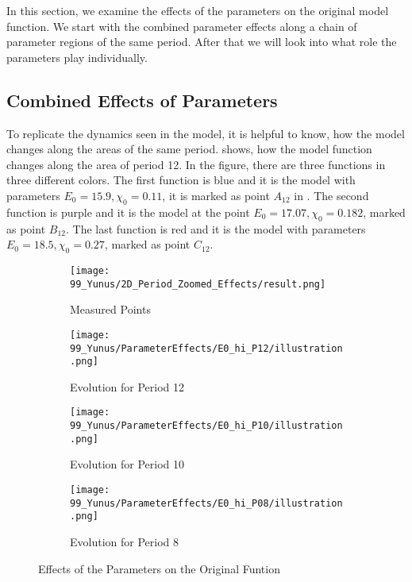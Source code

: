 In this section, we examine the effects of the parameters on the original model function.
We start with the combined parameter effects along a chain of parameter regions of the same period.
After that we will look into what role the parameters play individually.

\subsection{Combined Effects of Parameters}
\label{sec:setup.char.paramfx.combined}
\label{sec:yunus.param.effects.combined}

To replicate the dynamics seen in the model, it is helpful to know, how the model changes along the areas of the same period.
 shows, how the model function changes along the area of period 12.
In the figure, there are three functions in three different colors.
The first function is blue and it is the model with parameters $E_0 = 15.9, \chi_0 = 0.11$, it is marked as point $A_12$ in .
The second function is purple and it is the model at the point $E_0 = 17.07, \chi_0 = 0.182$, marked as point $B_{12}$.
The last function is red and it is the model with parameters $E_0 = 18.5, \chi_0 = 0.27$, marked as point $C_{12}$.

\begin{figure}
	\centering
	\begin{subfigure}{0.4\textwidth}
		\texttt{[image: 99\_Yunus/2D\_Period\_Zoomed\_Effects/result.png]}
		\caption{Measured Points}
		\label{fig:yunus.function.evolution.map}
	\end{subfigure}
	\begin{subfigure}{0.4\textwidth}
		\texttt{[image: 99\_Yunus/ParameterEffects/E0\_hi\_P12/illustration.png]}
		\caption{Evolution for Period 12}
		\label{fig:yunus.function.evolution.12}
	\end{subfigure}
	\begin{subfigure}{0.4\textwidth}
		\texttt{[image: 99\_Yunus/ParameterEffects/E0\_hi\_P10/illustration.png]}
		\caption{Evolution for Period 10}
		\label{fig:yunus.function.evolution.10}
	\end{subfigure}
	\begin{subfigure}{0.4\textwidth}
		\texttt{[image: 99\_Yunus/ParameterEffects/E0\_hi\_P08/illustration.png]}
		\caption{Evolution for Period 8}
		\label{fig:yunus.function.evolution.08}
	\end{subfigure}
	\caption{Effects of the Parameters on the Original Funtion}
\end{figure}

